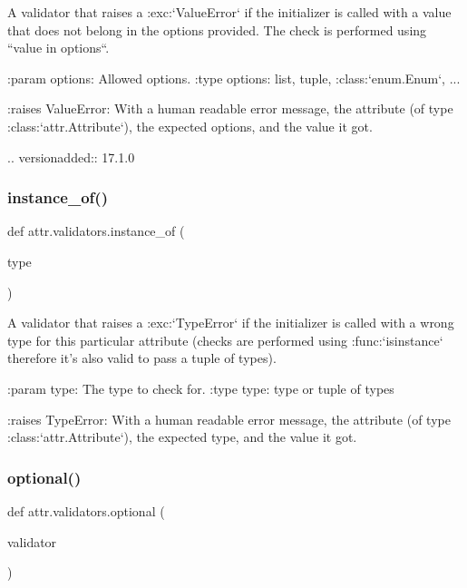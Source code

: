 \begin{DoxyVerb}A validator that raises a :exc:`ValueError` if the initializer is called
with a value that does not belong in the options provided.  The check is
performed using ``value in options``.

:param options: Allowed options.
:type options: list, tuple, :class:`enum.Enum`, ...

:raises ValueError: With a human readable error message, the attribute (of
   type :class:`attr.Attribute`), the expected options, and the value it
   got.

.. versionadded:: 17.1.0
\end{DoxyVerb}
 \mbox{\label{namespaceattr_1_1validators_afb2ed7b7c580c1c23a2614e689c6b8ca}} 
\subsubsection{\texorpdfstring{instance\+\_\+of()}{instance\_of()}}
{\footnotesize\ttfamily def attr.\+validators.\+instance\+\_\+of (\begin{DoxyParamCaption}\item[{}]{type }\end{DoxyParamCaption})}

\begin{DoxyVerb}A validator that raises a :exc:`TypeError` if the initializer is called
with a wrong type for this particular attribute (checks are performed using
:func:`isinstance` therefore it's also valid to pass a tuple of types).

:param type: The type to check for.
:type type: type or tuple of types

:raises TypeError: With a human readable error message, the attribute
    (of type :class:`attr.Attribute`), the expected type, and the value it
    got.
\end{DoxyVerb}
 \mbox{\label{namespaceattr_1_1validators_a16d222bb733631cf016c1e47f96d838c}} 
\subsubsection{\texorpdfstring{optional()}{optional()}}
{\footnotesize\ttfamily def attr.\+validators.\+optional (\begin{DoxyParamCaption}\item[{}]{validator }\end{DoxyParamCaption})}

